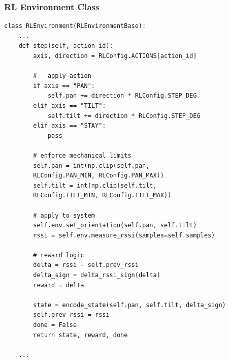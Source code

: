 \subsubsection*{RL Environment Class}
{}
\begin{verbatim}
class RLEnvironment(RLEnvironmentBase):
    ...
    def step(self, action_id):
        axis, direction = RLConfig.ACTIONS[action_id]

        # - apply action--
        if axis == "PAN":
            self.pan += direction * RLConfig.STEP_DEG
        elif axis == "TILT":
            self.tilt += direction * RLConfig.STEP_DEG
        elif axis == "STAY":
            pass

        # enforce mechanical limits
        self.pan = int(np.clip(self.pan, 
        RLConfig.PAN_MIN, RLConfig.PAN_MAX))
        self.tilt = int(np.clip(self.tilt, 
        RLConfig.TILT_MIN, RLConfig.TILT_MAX))

        # apply to system
        self.env.set_orientation(self.pan, self.tilt)
        rssi = self.env.measure_rssi(samples=self.samples)

        # reward logic
        delta = rssi - self.prev_rssi
        delta_sign = delta_rssi_sign(delta)
        reward = delta

        state = encode_state(self.pan, self.tilt, delta_sign)
        self.prev_rssi = rssi
        done = False
        return state, reward, done
    
    ...
\end{verbatim}

